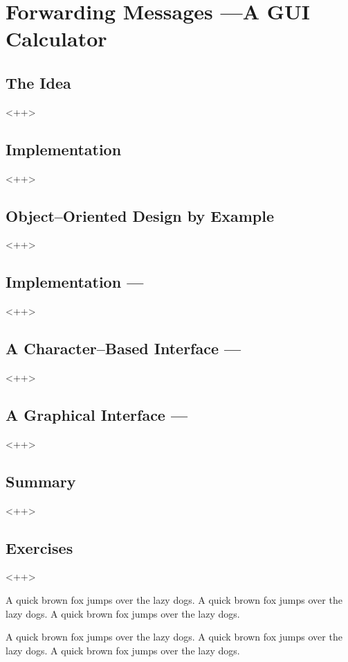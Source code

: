

\chapter{Forwarding Messages ---A GUI Calculator}

\section{The Idea}<++>

\section{Implementation}<++>

\section{Object--Oriented Design by Example}<++>

\section{Implementation ---}<++>

\section{A Character--Based Interface ---}<++>

\section{A Graphical Interface ---}<++>

\section{Summary}<++>

\section{Exercises}<++>

A quick brown fox jumps over the lazy dogs.
A quick brown fox jumps over the lazy dogs.
A quick brown fox jumps over the lazy dogs.

A quick brown fox jumps over the lazy dogs.
A quick brown fox jumps over the lazy dogs.
A quick brown fox jumps over the lazy dogs.


